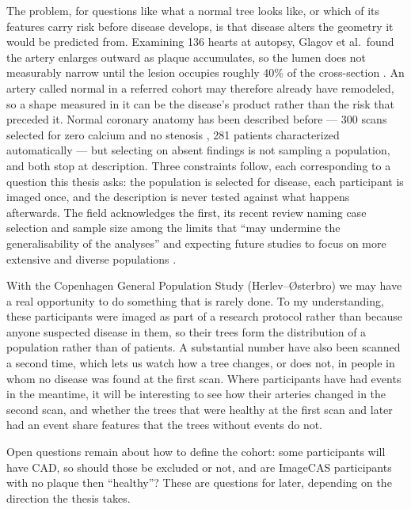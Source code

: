 The problem, for questions like what a normal tree looks like, or which of its features carry risk
before disease develops, is that disease alters the geometry it would be predicted from.
Examining 136 hearts at autopsy, Glagov et al.\ found the artery enlarges outward as plaque
accumulates, so the lumen does not measurably narrow until the lesion occupies roughly 40\% of the
cross-section \cite{glagov1987remodeling}.
An artery called normal in a referred cohort may therefore already have remodeled, so a shape
measured in it can be the disease's product rather than the risk that preceded it.
Normal coronary anatomy has been described before --- 300 scans selected for zero calcium and no
stenosis \cite{medranogracia2016atlas}, 281 patients characterized automatically
\cite{nannini2024characterization} --- but selecting on absent findings is not sampling a
population, and both stop at description.
Three constraints follow, each corresponding to a question this thesis asks: the population is
selected for disease, each participant is imaged once, and the description is never tested against
what happens afterwards.
The field acknowledges the first, its recent review naming case selection and sample size among the
limits that ``may undermine the generalisability of the analyses'' and expecting future studies to
focus on more extensive and diverse populations \cite{shen2026geometry}.


With the Copenhagen General Population Study (Herlev--{\O}sterbro) we may have a real opportunity to
do something that is rarely done. To my understanding, these participants were imaged as part of a
research protocol rather than because anyone suspected disease in them, so their trees form the
distribution of a population rather than of patients. A substantial number have also been scanned a
second time, which lets us watch how a tree changes, or does not, in people in whom no disease was
found at the first scan. Where participants have had events in the meantime, it will be interesting
to see how their arteries changed in the second scan, and whether the trees that were healthy at the
first scan and later had an event share features that the trees without events do not.

Open questions remain about how to define the cohort: some participants will have CAD, so should
those be excluded or not, and are ImageCAS participants with no plaque then ``healthy''? These are
questions for later, depending on the direction the thesis takes.
